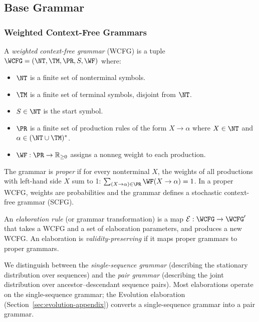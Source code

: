 \subsection{Base Grammar}

\subsubsection{Weighted Context-Free Grammars}

\begin{definition}
A \emph{weighted context-free grammar} (WCFG) is a tuple
$\WCFG = (\NT, \TM, \PR, S, \WF)$ where:
\begin{itemize}
\item $\NT$ is a finite set of nonterminal symbols.
\item $\TM$ is a finite set of terminal symbols, disjoint from $\NT$.
\item $S \in \NT$ is the start symbol.
\item $\PR$ is a finite set of production rules of the form $X \to \alpha$
  where $X \in \NT$ and $\alpha \in (\NT \cup \TM)^*$.
\item $\WF : \PR \to \mathbb{R}_{\geq 0}$ assigns a nonneg weight to each production.
\end{itemize}
The grammar is \emph{proper} if for every nonterminal $X$,
the weights of all productions with left-hand side $X$ sum to 1:
$\sum_{(X \to \alpha) \in \PR} \WF(X \to \alpha) = 1$.
In a proper WCFG, weights are probabilities and the grammar defines
a stochastic context-free grammar (SCFG).
\end{definition}

\begin{definition}
An \emph{elaboration rule} (or grammar transformation) is a map
$\mathcal{E} : \WCFG \to \WCFG'$ that takes a WCFG
and a set of elaboration parameters, and produces a new WCFG.
An elaboration is \emph{validity-preserving} if it maps
proper grammars to proper grammars.
\end{definition}

We distinguish between the \emph{single-sequence grammar}
(describing the stationary distribution over sequences)
and the \emph{pair grammar} (describing the joint distribution
over ancestor--descendant sequence pairs).  Most elaborations
operate on the single-sequence grammar; the Evolution elaboration
(Section~\ref{sec:evolution-appendix}) converts a single-sequence grammar
into a pair grammar.

